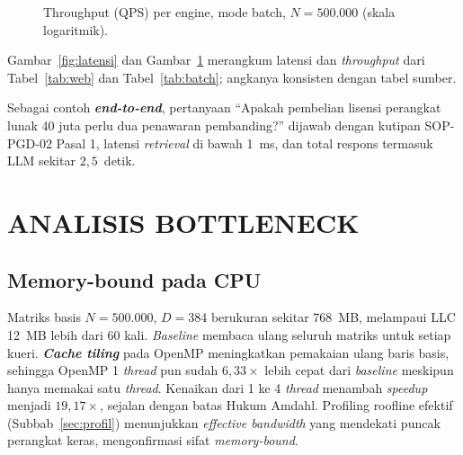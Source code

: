 \documentclass[12pt,a4paper,oneside]{report}
\newcommand{\keyword}[1]{\textbf{\textit{#1}}}
\begin{document}
\begin{figure}[H]
\centering
{}
\caption{Throughput (QPS) per engine, mode batch, $N=500.000$ (skala logaritmik).}
\label{fig:qps}
\end{figure}

Gambar~\ref{fig:latensi} dan Gambar~\ref{fig:qps} merangkum latensi dan \textit{throughput} dari Tabel~\ref{tab:web} dan Tabel~\ref{tab:batch}; angkanya konsisten dengan tabel sumber.

Sebagai contoh \keyword{end-to-end}, pertanyaan ``Apakah pembelian lisensi perangkat lunak 40 juta perlu dua penawaran pembanding?'' dijawab dengan kutipan SOP-PGD-02 Pasal 1, latensi \textit{retrieval} di bawah 1~ms, dan total respons termasuk LLM sekitar $2{,}5$~detik.

\chapter{ANALISIS BOTTLENECK}

\section{Memory-bound pada CPU}

Matriks basis $N=500.000$, $D=384$ berukuran sekitar $768$~MB, melampaui LLC 12~MB lebih dari $60$ kali. \textit{Baseline} membaca ulang seluruh matriks untuk setiap kueri. \keyword{Cache tiling} pada OpenMP meningkatkan pemakaian ulang baris basis, sehingga OpenMP 1 \textit{thread} pun sudah $6{,}33\times$ lebih cepat dari \textit{baseline} meskipun hanya memakai satu \textit{thread}. Kenaikan dari 1 ke 4 \textit{thread} menambah \textit{speedup} menjadi $19{,}17\times$, sejalan dengan batas Hukum Amdahl. Profiling roofline efektif (Subbab~\ref{sec:profil}) menunjukkan \textit{effective bandwidth} yang mendekati puncak perangkat keras, mengonfirmasi sifat \textit{memory-bound}.
\end{document}
